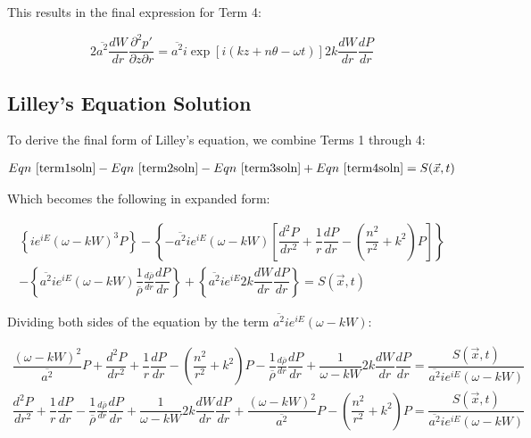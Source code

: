 \documentclass[]{aiaa-tc}%
\begin{document}
This results in the final expression for Term 4:

\begin{equation} \label{term4soln}
\boxed{2\overline{a^2} \dfrac{dW}{dr}\dfrac{\partial^2p'}{\partial z\partial r}
  = \overline{a^2} i\exp[i(kz + n\theta -\omega t)]
    2k \dfrac{dW}{dr} \dfrac{dP}{dr} }
\end{equation}




\subsection{Lilley's Equation Solution}

To derive the final form of Lilley's equation, we combine Terms 1 through 4:

\begin{align*}
Eqn~\ref{term1soln} - Eqn~\ref{term2soln} - Eqn~\ref{term3soln} + Eqn~\ref{term4soln} = S(\vec{x}, t)
\end{align*}

Which becomes the following in expanded form:

\begin{align*}
\left\{ ie^{iE} (\omega - kW)^3 P \right\}
- \left\{ - \overline{a^2} ie^{iE}
    (\omega - kW) \left[ \dfrac{d^2P}{dr^2}
    + \dfrac{1}{r} \dfrac{dP}{dr}
    - \left( \dfrac{n^2}{r^2} + k^2 \right) P \right] \right\} \\
- \left\{ \overline{a^2} ie^{iE} (\omega - kW)
    \dfrac{1}{\overline{\rho}}\frac{d \overline{\rho}}{dr} \dfrac{dP}{dr} \right\}
+ \left\{ \overline{a^2} ie^{iE} 2k \dfrac{dW}{dr} \dfrac{dP}{dr} \right\}
= S(\vec{x}, t)
\end{align*}

Dividing both sides of the equation by the term $\overline{a^2} ie^{iE} (\omega - kW)$:

\begin{align*}
\dfrac{(\omega - kW)^2}{\overline{a^2}} P
+ \dfrac{d^2P}{dr^2}
+ \dfrac{1}{r} \dfrac{dP}{dr}
- \left( \dfrac{n^2}{r^2} + k^2 \right) P
- \dfrac{1}{\overline{\rho}}\frac{d \overline{\rho}}{dr} \dfrac{dP}{dr}
+ \dfrac{1}{\omega - kW} 2k \dfrac{dW}{dr} \dfrac{dP}{dr}
= \dfrac{S(\vec{x}, t)}{\overline{a^2} ie^{iE} (\omega - kW)} \\
\dfrac{d^2P}{dr^2}
+ \dfrac{1}{r} \dfrac{dP}{dr}
- \dfrac{1}{\overline{\rho}}\frac{d \overline{\rho}}{dr} \dfrac{dP}{dr}
+ \dfrac{1}{\omega - kW} 2k \dfrac{dW}{dr} \dfrac{dP}{dr}
+ \dfrac{(\omega - kW)^2}{\overline{a^2}} P
- \left( \dfrac{n^2}{r^2} + k^2 \right) P
= \dfrac{S(\vec{x}, t)}{\overline{a^2} ie^{iE} (\omega - kW)} \\
\end{align*}
\end{document}
